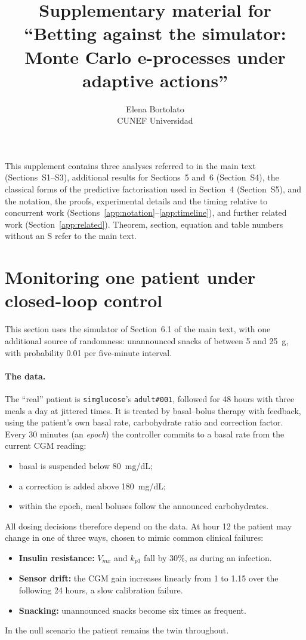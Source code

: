 \documentclass[11pt]{article}
\title{Supplementary material for ``Betting against the simulator:\\
Monte Carlo e-processes under adaptive actions''}
\author{Elena Bortolato\\ CUNEF Universidad}
\author{}
\date{}
\theoremstyle{remark}
\begin{document}
\maketitle

This supplement contains three analyses referred to in the main text
(Sections~S1--S3), additional results for Sections~5 and~6 (Section~S4), the
classical forms of the predictive factorisation used in Section~4
(Section~S5), and the notation, the proofs, experimental details and the timing
relative to concurrent work (Sections~\ref{app:notation}--\ref{app:timeline}), and
further related work (Section~\ref{app:related}).
Theorem, section, equation and table numbers without an S refer to the main
text.

\section{Monitoring one patient under closed-loop control}\label{sec:t1d-patient}

This section uses the simulator of Section~6.1 of the main
text, with one additional source of randomness: unannounced snacks of between
5 and 25~g, with probability 0.01 per five-minute interval.

\paragraph{The data.} The ``real'' patient is \texttt{simglucose}'s
\texttt{adult\#001}, followed for 48 hours with three meals a day at jittered
times. It is treated by basal--bolus therapy with feedback, using the
patient's own basal rate, carbohydrate ratio and correction factor. Every 30
minutes (an \emph{epoch}) the controller commits to a basal rate from the
current CGM reading:
\begin{itemize}
  \item basal is suspended below 80~mg/dL;
  \item a correction is added above 180~mg/dL;
  \item within the epoch, meal boluses follow the announced carbohydrates.
\end{itemize}
All dosing decisions therefore depend on the data. At hour 12 the patient may
change in one of three ways, chosen to mimic common clinical failures:
\begin{itemize}
  \item \textbf{Insulin resistance:} $V_{mx}$ and $k_{p3}$ fall by 30\%, as
        during an infection.
  \item \textbf{Sensor drift:} the CGM gain increases linearly from 1 to 1.15
        over the following 24 hours, a slow calibration failure.
  \item \textbf{Snacking:} unannounced snacks become six times as frequent.
\end{itemize}
In the null scenario the patient remains the twin throughout.
\end{document}
